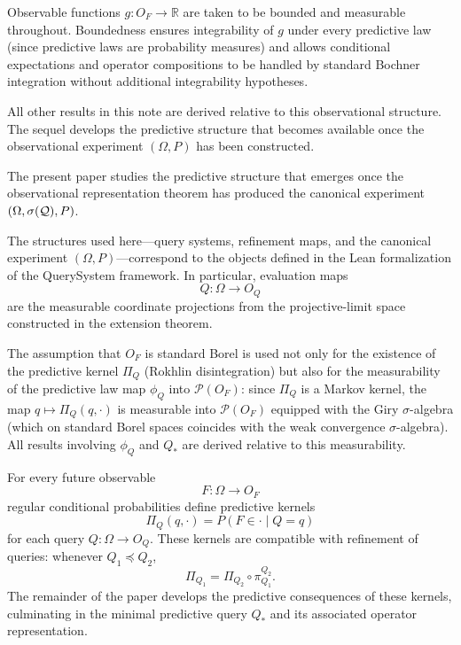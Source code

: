 Observable functions $g:O_F\to\mathbb R$ are taken to be bounded and
measurable throughout.  Boundedness ensures integrability of $g$ under
every predictive law (since predictive laws are probability measures)
and allows conditional expectations and operator compositions to be
handled by standard Bochner integration without additional
integrability hypotheses.

All other results in this note are derived relative to this observational
structure.  The sequel develops the predictive structure that becomes
available once the observational experiment $(\Omega,P)$ has been
constructed.

\begin{remark}
The present paper studies the predictive structure that emerges once
the observational representation theorem has produced the canonical
experiment $(\Omega,\sigma(\mathcal{Q}),P)$.
\end{remark}

\begin{remark}[Formalization]
The structures used here---query systems, refinement maps, and the
canonical experiment $(\Omega,P)$---correspond to the objects defined in
the Lean formalization of the QuerySystem framework.  In particular,
evaluation maps
\[
Q:\Omega\to O_Q
\]
are the measurable coordinate projections from the projective-limit
space constructed in the extension theorem.

The assumption that $O_F$ is standard Borel is used not only for the
existence of the predictive kernel $\Pi_Q$ (Rokhlin disintegration)
but also for the measurability of the predictive law map $\phi_Q$ into
$\mathcal P(O_F)$: since $\Pi_Q$ is a Markov kernel, the map
$q\mapsto\Pi_Q(q,\cdot)$ is measurable into $\mathcal P(O_F)$ equipped
with the Giry $\sigma$-algebra (which on standard Borel spaces coincides
with the weak convergence $\sigma$-algebra).  All results involving
$\phi_Q$ and $Q_*$ are derived relative to this measurability.
\end{remark}

For every future observable
\[
F:\Omega\to O_F
\]
regular conditional probabilities define predictive kernels
\[
\Pi_Q(q,\cdot)=P(F\in\cdot\mid Q=q)
\]
for each query $Q:\Omega\to O_Q$.  These kernels are compatible with
refinement of queries: whenever $Q_1\preceq Q_2$,
\[
\Pi_{Q_1}=\Pi_{Q_2}\circ\pi^{Q_2}_{Q_1}.
\]
The remainder of the paper develops the predictive consequences of
these kernels, culminating in the minimal predictive query $Q_*$ and
its associated operator representation.

